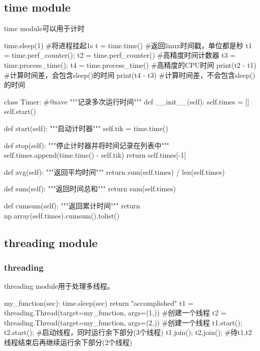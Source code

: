  \subsection{time module}
    time module可以用于计时
    \begin{codeblock}[language=python, caption={time module}]
      time.sleep(1) #将进程挂起1s
      t = time.time() #返回linux时间戳，单位都是秒
      t1 = time.perf_counter(); t2 = time.perf_counter() #高精度时间计数器
      t3 = time.process_time(); t4 = time.process_time() #高精度的CPU时间
      print(t2 - t1) #计算时间差，会包含sleep()的时间
      print(t4 - t3) #计算时间差，不会包含sleep()的时间
    \end{codeblock}

    \begin{codeblock}[language=python, caption={Timer Class}]
      class Timer:  #@save
          """记录多次运行时间"""
          def __init__(self):
              self.times = []
              self.start()

          def start(self):
              """启动计时器"""
              self.tik = time.time()

          def stop(self):
              """停止计时器并将时间记录在列表中"""
              self.times.append(time.time() - self.tik)
              return self.times[-1]

          def avg(self):
              """返回平均时间"""
              return sum(self.times) / len(self.times)

          def sum(self):
              """返回时间总和"""
              return sum(self.times)

          def cumsum(self):
              """返回累计时间"""
              return np.array(self.times).cumsum().tolist()
    \end{codeblock}

  \subsection{threading module}
    \subsubsection{threading}
      threading module用于处理多线程。
      \begin{codeblock}[language=python, caption={threading module}]
        my_function(sec):
            time.sleep(sec)
            return "accomplished"
        t1 = threading.Thread(target=my_function, args=(1,)) #创建一个线程
        t2 = threading.Thread(target=my_function, args=(2,)) #创建一个线程
        t1.start(); t2.start(); #启动线程，同时运行余下部分(3个线程)
        t1.join(); t2.join(); #待t1,t2线程结束后再继续运行余下部分(2个线程)
      \end{codeblock}

